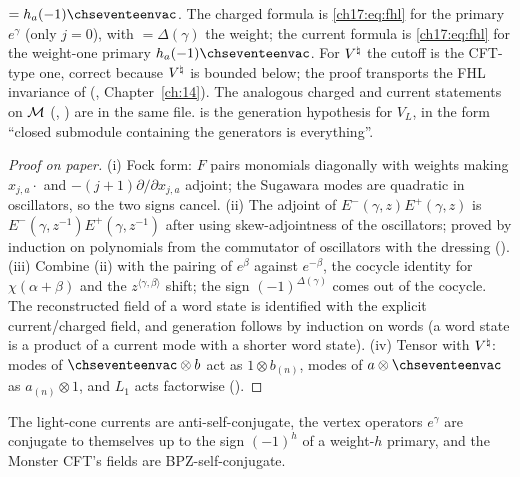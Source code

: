 \begin{dictionary}
 $=h_a(-1)\chseventeenvac$.  The charged formula is \eqref{ch17:eq:fhl} for the primary $e^\gamma$ (only
$j=0$), with  $=\Delta(\gamma)$ the weight; the current formula is \eqref{ch17:eq:fhl} for the weight-one primary
$h_a(-1)\chseventeenvac$.  For ${V^{\natural}}$ the cutoff  is the CFT-type one, correct because ${V^{\natural}}$ is bounded below;
the proof transports the FHL invariance of  (, Chapter~\ref{ch:14}).  The analogous charged and
current statements on $\mathcal{M}$ (,
) are in the same file.  
is the generation hypothesis  for $V_L$, in the form ``closed submodule containing the generators is everything''.
\end{dictionary}

\begin{proof}[Proof on paper]
(i) Fock form: $F$ pairs monomials diagonally with weights making $x_{j,a}\cdot$ and $-(j+1)\partial/\partial x_{j,a}$ adjoint; the
Sugawara modes are quadratic in oscillators, so the two signs cancel.  (ii) The adjoint of $E^-(\gamma,z)E^+(\gamma,z)$ is
$E^-(\gamma,z^{-1})E^+(\gamma,z^{-1})$ after using skew-adjointness of the oscillators; proved by induction on polynomials from the
commutator of oscillators with the dressing ().  (iii) Combine (ii) with the
pairing of $e^\beta$ against $e^{-\beta}$, the cocycle identity for $\chi(\alpha+\beta)$ and the $z^{\langle\gamma,\beta\rangle}$ shift; the sign
$(-1)^{\Delta(\gamma)}$ comes out of the cocycle.  The reconstructed field of a word state is identified with the explicit current/charged
field, and generation follows by induction on words (a word state is a product of a current mode with a shorter word state).
(iv) Tensor with ${V^{\natural}}$: modes of $\chseventeenvac\otimes b$ act as $1\otimes b_{(n)}$, modes of $a\otimes\chseventeenvac$ as $a_{(n)}\otimes1$,
and $L_1$ acts factorwise ().
\end{proof}

\begin{physics}
The light-cone currents are anti-self-conjugate, the vertex operators $e^\gamma$ are conjugate to themselves up to the sign
$(-1)^{h}$ of a weight-$h$ primary, and the Monster CFT's fields are BPZ-self-conjugate.
\end{physics}

